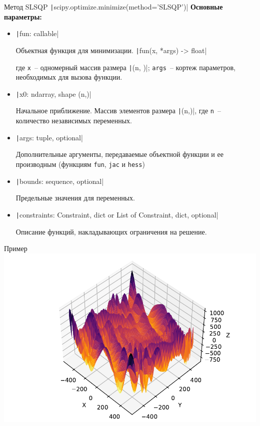 \documentclass[aspectratio=169, mathserif]{beamer}%
\begin{document}
\begin{frame}[fragile, label=c]{Метод SLSQP}
\scriptsize
\texttt|scipy.optimize.minimize(method='SLSQP')|
\vfill
\textbf{Основные параметры:}
\vfill
\begin{itemize}
\item[] \texttt|fun: callable|

Объектная функция для минимизации.
\vfill
\texttt|fun(x, *args) -> float|

где \texttt{x}~-- одномерный массив размера \texttt|(n, )|; \texttt{args}~-- кортеж параметров, необходимых для вызова функции.
\vfill
\item[] \texttt|x0: ndarray, shape (n,)|

Начальное приближение. Массив элементов размера \texttt|(n,)|, где \texttt{n}~-- количество независимых переменных.
\vfill
\item[] \texttt|args: tuple, optional|

Дополнительные аргументы, передаваемые объектной функции и ее производным (функциям \texttt{fun}, \texttt{jac} и \texttt{hess})
\vfill
\item[] \texttt|bounds: sequence, optional|

Предельные значения для переменных.
\vfill
\item[] \texttt|constraints: {Constraint, dict} or List of {Constraint, dict}, optional|

Описание функций, накладывающих ограничения на решение.
\end{itemize}
\vfill
\end{frame}


\begin{frame}[fragile, label=c]{Пример}
\scriptsize
\includegraphics[width=.6\textwidth]{./pics/eggholder}
\vfill
\end{frame}




\end{document}
